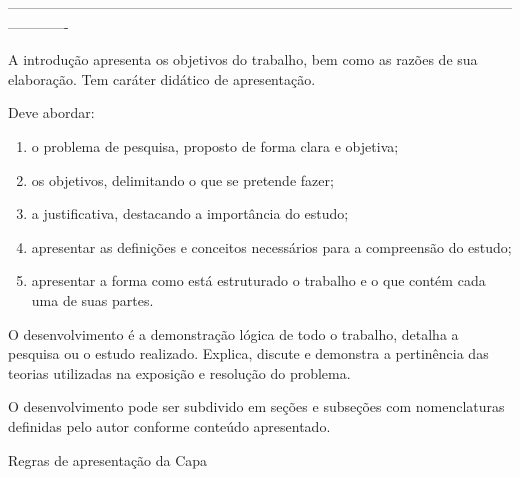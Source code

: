 -------------------------------------------------------------------------------------------------------------------------

A introdução apresenta os objetivos do trabalho, bem como as razões de sua elaboração. Tem caráter didático de apresentação.

Deve abordar:
\begin{enumerate}[noitemsep,nosep,labelindent=\parindent,leftmargin=*,label={\alph*}) ] 
	\item o problema de pesquisa, proposto de forma clara e objetiva;
	\item os objetivos, delimitando o que se pretende fazer;
	\item a justificativa, destacando a importância do estudo;
	\item apresentar as definições e conceitos necessários para a compreensão do estudo;
	\item apresentar a forma como está estruturado o trabalho e o que contém cada uma de suas partes.
\end{enumerate}

O desenvolvimento é a demonstração lógica de todo o trabalho, detalha a pesquisa ou o estudo realizado. Explica, discute e demonstra a pertinência das teorias utilizadas na exposição e resolução do problema. 

O desenvolvimento pode ser subdivido em seções e subseções com nomenclaturas definidas pelo autor conforme conteúdo apresentado. 

Regras de apresentação da Capa




